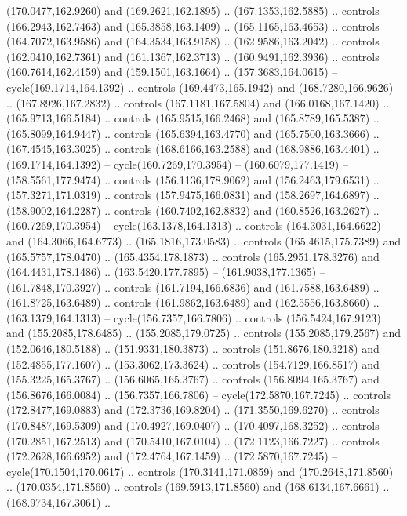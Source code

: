 \begin{scope}[cm={{1.25,0.0,0.0,-1.25,(0.0,442.91375)}}]
    (170.0477,162.9260) and (169.2621,162.1895) .. (167.1353,162.5885) .. controls
    (166.2943,162.7463) and (165.3858,163.1409) .. (165.1165,163.4653) .. controls
    (164.7072,163.9586) and (164.3534,163.9158) .. (162.9586,163.2042) .. controls
    (162.0410,162.7361) and (161.1367,162.3713) .. (160.9491,162.3936) .. controls
    (160.7614,162.4159) and (159.1501,163.1664) .. (157.3683,164.0615) --
    cycle(169.1714,164.1392) .. controls (169.4473,165.1942) and
    (168.7280,166.9626) .. (167.8926,167.2832) .. controls (167.1181,167.5804) and
    (166.0168,167.1420) .. (165.9713,166.5184) .. controls (165.9515,166.2468) and
    (165.8789,165.5387) .. (165.8099,164.9447) .. controls (165.6394,163.4770) and
    (165.7500,163.3666) .. (167.4545,163.3025) .. controls (168.6166,163.2588) and
    (168.9886,163.4401) .. (169.1714,164.1392) -- cycle(160.7269,170.3954) --
    (160.6079,177.1419) -- (158.5561,177.9474) .. controls (156.1136,178.9062) and
    (156.2463,179.6531) .. (157.3271,171.0319) .. controls (157.9475,166.0831) and
    (158.2697,164.6897) .. (158.9002,164.2287) .. controls (160.7402,162.8832) and
    (160.8526,163.2627) .. (160.7269,170.3954) -- cycle(163.1378,164.1313) ..
    controls (164.3031,164.6622) and (164.3066,164.6773) .. (165.1816,173.0583) ..
    controls (165.4615,175.7389) and (165.5757,178.0470) .. (165.4354,178.1873) ..
    controls (165.2951,178.3276) and (164.4431,178.1486) .. (163.5420,177.7895) --
    (161.9038,177.1365) -- (161.7848,170.3927) .. controls (161.7194,166.6836) and
    (161.7588,163.6489) .. (161.8725,163.6489) .. controls (161.9862,163.6489) and
    (162.5556,163.8660) .. (163.1379,164.1313) -- cycle(156.7357,166.7806) ..
    controls (156.5424,167.9123) and (155.2085,178.6485) .. (155.2085,179.0725) ..
    controls (155.2085,179.2567) and (152.0646,180.5188) .. (151.9331,180.3873) ..
    controls (151.8676,180.3218) and (152.4855,177.1607) .. (153.3062,173.3624) ..
    controls (154.7129,166.8517) and (155.3225,165.3767) .. (156.6065,165.3767) ..
    controls (156.8094,165.3767) and (156.8676,166.0084) .. (156.7357,166.7806) --
    cycle(172.5870,167.7245) .. controls (172.8477,169.0883) and
    (172.3736,169.8204) .. (171.3550,169.6270) .. controls (170.8487,169.5309) and
    (170.4927,169.0407) .. (170.4097,168.3252) .. controls (170.2851,167.2513) and
    (170.5410,167.0104) .. (172.1123,166.7227) .. controls (172.2628,166.6952) and
    (172.4764,167.1459) .. (172.5870,167.7245) -- cycle(170.1504,170.0617) ..
    controls (170.3141,171.0859) and (170.2648,171.8560) .. (170.0354,171.8560) ..
    controls (169.5913,171.8560) and (168.6134,167.6661) .. (168.9734,167.3061) ..

\end{scope}
